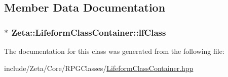 \subsection{Member Data Documentation}
\hypertarget{classZeta_1_1LifeformClassContainer_a462b408a813cc5532d40214058afc059}{
\subsubsection[{lf\+Class}]{$\ast$ Zeta\+::\+Lifeform\+Class\+Container\+::lf\+Class\hspace{0.3cm}{\ttfamily [private]}}}\label{classZeta_1_1LifeformClassContainer_a462b408a813cc5532d40214058afc059}


The documentation for this class was generated from the following file\+:\begin{DoxyCompactItemize}
\item 
include/\+Zeta/\+Core/\+R\+P\+G\+Classes/\hyperlink{LifeformClassContainer_8hpp}{Lifeform\+Class\+Container.\+hpp}\end{DoxyCompactItemize}
